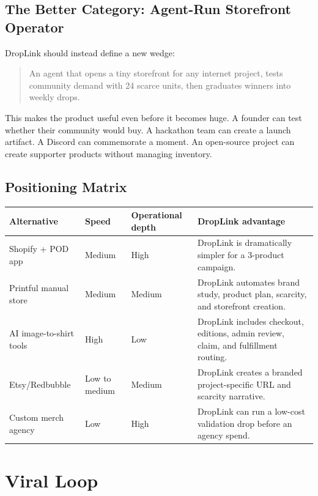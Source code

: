 \documentclass[11pt]{article}
\begin{document}
\subsection{The Better Category: Agent-Run Storefront Operator}

DropLink should instead define a new wedge:

\begin{quote}
  An agent that opens a tiny storefront for any internet project, tests community demand with 24 scarce units, then graduates winners into weekly drops.
\end{quote}

This makes the product useful even before it becomes huge. A founder can test whether their community would buy. A hackathon team can create a launch artifact. A Discord can commemorate a moment. An open-source project can create supporter products without managing inventory.

\subsection{Positioning Matrix}

\begin{longtable}{p{}p{}p{}p{}}
\toprule
\textbf{Alternative} & \textbf{Speed} & \textbf{Operational depth} & \textbf{DropLink advantage} \\
\midrule
\endhead
Shopify + POD app & Medium & High & DropLink is dramatically simpler for a 3-product campaign. \\
Printful manual store & Medium & Medium & DropLink automates brand study, product plan, scarcity, and storefront creation. \\
AI image-to-shirt tools & High & Low & DropLink includes checkout, editions, admin review, claim, and fulfillment routing. \\
Etsy/Redbubble & Low to medium & Medium & DropLink creates a branded project-specific URL and scarcity narrative. \\
Custom merch agency & Low & High & DropLink can run a low-cost validation drop before an agency spend. \\
\bottomrule
\end{longtable}

\section{Viral Loop}
\end{document}
